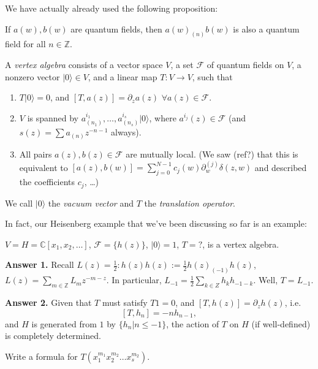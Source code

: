 We have actually already used the following
proposition:

\begin{proposition}
\label{proposition-nth-produ-quant-field}
If $a(w),b(w)$ are quantum fields, then
$a(w)_{(n)}b(w)$
is also a quantum field for all $n \in
\mathbb{Z}$.
\end{proposition}

\begin{definition}
\label{definition-vertex-algebra}
A {\it vertex algebra} consists of a vector
space $V$,
a set $\mathcal{F}$ of quantum fields on $V$,
a nonzero vector $|0\rangle\in V$,
and a linear map $T:V \to V$,
such that
\begin{enumerate}
\item $T|0\rangle=0$, and
$[T,a(z)]=\partial_za(z)$
$\forall a(z) \in \mathcal{F}$.
\item $V$ is spanned by
$a_{(n_1)}^{i_1},\ldots,a_{(n_s)}^{i_s}
|0\rangle$,
where $a^{i_j}(z) \in \mathcal{F}$ (and
$s(z)=\sum a_{(n)}z^{-n-1}$ always).
\item All pairs $a(z),b(z) \in \mathcal{F}$
are mutually local.
(We saw (ref?) that this is equivalent to
$[a(z),b(w)]=\sum_{j=0}^{N-1}c_j(w)
\partial_w^{(j)}\delta(z,w)$
and
described the coefficients $c_j$, …)
\end{enumerate}
\end{definition}

We call $|0\rangle$ the {\it vacuum vector}
and $T$ the {\it translation
operator}.

In fact, our Heisenberg example that we've
been discussing
so far is an example:

\begin{example}
\label{example-Heisenberg-is-vertex-algebra}
$V=H=\mathbb{C}[x_1,x_2,\ldots]$,
$\mathcal{F}=\{h(z)\}$, $|0\rangle=1$, $T=?$,
is a vertex algebra.

\noindent
{\bf Answer 1.} Recall
$L(z)=\frac{1}{2}:\!h(z)h(z)\!:=
\frac{1}{2}h(z)_{(-1)}h(z)$, $L(z)=\sum_{m
\in \mathbb{Z}}L_mz^{-m-z}$.
In particular, $L_{-1}=\frac{1}{2}\sum_{k \in
Z}h_kh_{-1-k}$.
Well, $T=L_{-1}$.

\noindent
{\bf Answer 2.} Given that $T$ must satisfy
$T1=0$, and $[T,h(z)]=\partial_zh(z)$, i.e.
$$
[T,h_n]=-nh_{n-1},
$$
and $H$ is generated from $1$ by $\{h_n|n\leq
-1\}$,
the action of $T$ on $H$ (if well-defined) is
completely determined.
\end{example}

\begin{exercise}
\label{exercise-write-a-formula}
Write a formula for
$T(x_1^{m_1}x_2^{m_2}\ldots x_s^{m_2})$.
\end{exercise}

